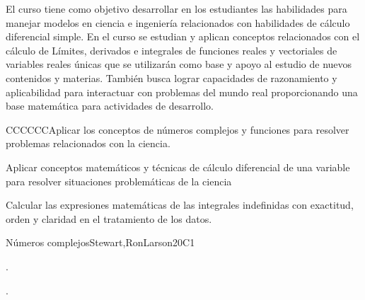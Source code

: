 \begin{syllabus}


\begin{justification}
El curso tiene como objetivo desarrollar en los estudiantes las habilidades para manejar modelos en ciencia e ingeniería relacionados con habilidades de cálculo diferencial simple. En el curso se estudian y aplican conceptos relacionados con el cálculo de Límites, derivados e integrales de funciones reales y vectoriales de variables reales únicas que se utilizarán como base y
apoyo al estudio de nuevos contenidos y materias. También busca lograr capacidades de razonamiento y aplicabilidad para interactuar con problemas del mundo real proporcionando una base matemática para actividades de desarrollo.
\end{justification}

\begin{goals}
\item CCCCCCAplicar los conceptos de números complejos y funciones para resolver problemas relacionados con la ciencia.
\item Aplicar conceptos matemáticos y técnicas de cálculo diferencial de una variable para resolver situaciones problemáticas de la ciencia
\item Calcular las expresiones matemáticas de las integrales indefinidas con exactitud, orden y claridad en el tratamiento de los datos.

\end{goals}

\begin{outcomes}
    \item {}
    \item {}
\end{outcomes}

\begin{competences}
    \item {}
    \item {}
    \item {}
\end{competences}

\begin{unit}{Números complejos}{}{Stewart,RonLarson}{20}{C1}
   \begin{topics}
    \item . %
    \item . %
   \end{topics}


\end{unit}
\end{syllabus}
